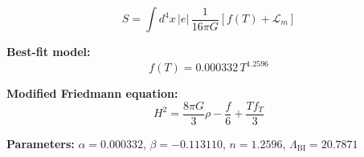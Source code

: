 
\begin{equation}
  S = \int d^4x \, |e| \, \frac{1}{16\pi G} \left[ f(T) + \mathcal{L}_m \right]
\end{equation}

\textbf{Best-fit model:}
\begin{equation}
  f(T) = 0.000332 \, T^{1.2596}
\end{equation}

\textbf{Modified Friedmann equation:}
\begin{equation}
  H^2 = \frac{8\pi G}{3} \rho - \frac{f}{6} + \frac{T f_T}{3}
\end{equation}

\textbf{Parameters:}
$\alpha = 0.000332$, \quad
$\beta = -0.113110$, \quad
$n = 1.2596$, \quad
$\Lambda_{\text{BI}} = 20.7871$